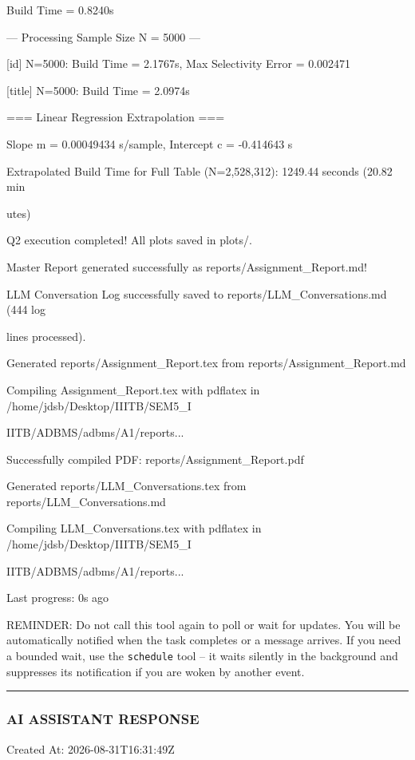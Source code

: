 \documentclass[11pt,a4paper]{article}
\begin{document}
Build Time = 0.8240s

--- Processing Sample Size N = 5000 ---

[id] N=5000: Build Time = 2.1767s, Max Selectivity Error = 0.002471

[title] N=5000: Build Time = 2.0974s

=== Linear Regression Extrapolation ===

Slope m = 0.00049434 s/sample, Intercept c = -0.414643 s

Extrapolated Build Time for Full Table (N=2,528,312): 1249.44 seconds (20.82 min

utes)

Q2 execution completed! All plots saved in plots/.

Master Report generated successfully as reports/Assignment\_Report.md!

LLM Conversation Log successfully saved to reports/LLM\_Conversations.md (444 log

lines processed).

Generated reports/Assignment\_Report.tex from reports/Assignment\_Report.md

Compiling Assignment\_Report.tex with pdflatex in /home/jdsb/Desktop/IIITB/SEM5\_I

IITB/ADBMS/adbms/A1/reports...

Successfully compiled PDF: reports/Assignment\_Report.pdf

Generated reports/LLM\_Conversations.tex from reports/LLM\_Conversations.md

Compiling LLM\_Conversations.tex with pdflatex in /home/jdsb/Desktop/IIITB/SEM5\_I

IITB/ADBMS/adbms/A1/reports...


Last progress: 0s ago



REMINDER: Do not call this tool again to poll or wait for updates. You will be automatically notified when the task completes or a message arrives. If you need a bounded wait, use the \texttt{schedule} tool -- it waits silently in the background and suppresses its notification if you are woken by another event.


\hrule

\subsubsection{AI ASSISTANT RESPONSE}

Created At: 2026-08-31T16:31:49Z
\end{document}

